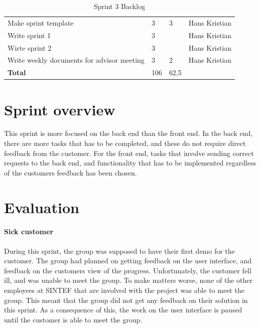 \documentclass[11pt,a4paper,titlepage,oneside]{report}
\begin{document}
\begin{table}[h]
{\begin{tabular}{llll}
Make sprint template                                                                            & 3                                                                   & 3                                                      & Hans Kristian \\
Write sprint 1                                                                                  & 3                                                                   &                                                        & Hans Kristian \\
Wirte sprint 2                                                                                  & 3                                                                   &                                                        & Hans Kristian \\
Write weekly documents for advisor meeting                                                      & 3                                                                   & 2                                                      & Hans Kristian \\
\rowcolor[HTML]{C0C0C0} 
\textbf{Total}                                                                                  & 106                                                                 & 62,5                                                   &              
\end{tabular}
}
\caption{Sprint 3 Backlog}
\label{tab:Sprint3Backlog}
\end{table}

\section{Sprint overview}
This sprint is more focused on the back end than the front end. In the back end, there are more tasks that has to be completed, and these do not require direct feedback from the customer. For the front end, tasks that involve sending correct requests to the back end, and functionality that has to be implemented regardless of the customers feedback has been chosen. 
\section{Evaluation}
\paragraph{Sick customer}
During this sprint, the group was supposed to have their first demo for the customer. The group had planned on getting feedback on the user interface, and feedback on the customers view of the progress. Unfortunately, the customer fell ill, and was unable to meet the group. To make matters worse, none of the other employees at SINTEF that are involved with the project was able to meet the group. This meant that the group did not get any feedback on their solution in this sprint. As a consequence of this, the work on the user interface is paused until the customer is able to meet the group. 
\end{document}
